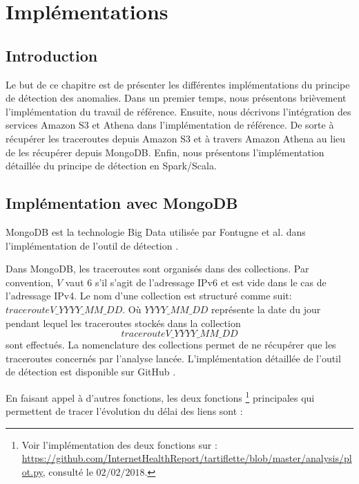 \chapter{Implémentations  } \label{chapter-implementations}


\section{Introduction}

Le but de ce chapitre est de présenter les différentes implémentations du principe de détection des anomalies.  Dans un premier temps, nous présentons brièvement l'implémentation du travail de  référence. Ensuite, nous décrivons l'intégration des services Amazon S3 et Athena dans l'implémentation de référence.  De sorte à récupérer les traceroutes depuis Amazon S3 et à travers   Amazon Athena au lieu de les récupérer depuis MongoDB. Enfin, nous présentons l'implémentation détaillée du principe de détection en Spark/Scala. 

\section{Implémentation avec MongoDB}

MongoDB est la technologie Big Data utilisée par  Fontugne et al.  dans l'implémentation de l'outil de détection \cite{InternetHealthReport}. 


Dans MongoDB, les traceroutes sont organisés  dans des collections.  Par convention,  $V$  vaut $6$ s'il s'agit de l'adressage IPv6 et est vide dans le cas de l'adressage IPv4.  Le nom d'une collection est structuré comme suit: 	$tracerouteV\_YYYY\_MM\_DD$. Où $ YYYY\_MM\_DD $ représente la date du jour pendant lequel les traceroutes stockés dans la collection $$tracerouteV\_YYYY\_MM\_DD$$ sont effectués.
La nomenclature  des collections permet de ne récupérer que les traceroutes concernés par l'analyse lancée.
L'implémentation détaillée de l'outil de détection est disponible sur GitHub \cite{InternetHealthReport}.  

En faisant appel à d'autres fonctions, les deux fonctions 
\footnote{Voir l'implémentation des deux fonctions sur : \url{https://github.com/InternetHealthReport/tartiflette/blob/master/analysis/plot.py}, consulté  le $ 02/02/2018$.} principales qui permettent de tracer l'évolution du délai des liens sont  :  

